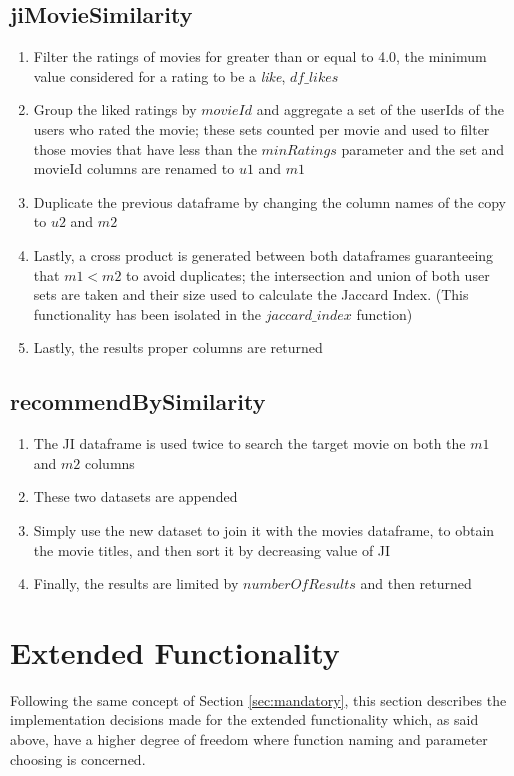 \documentclass[10pt,twocolumn]{article}
\begin{document}
\subsection{jiMovieSimilarity}
\begin{enumerate}
    \itemsep0em
    \item Filter the ratings of movies for greater than or equal to 4.0, the minimum value considered for a rating to be a \textit{like}, $df\_likes$
    \item Group the liked ratings by $movieId$ and aggregate a set of the userIds of the users who rated the movie; these sets counted per movie and used to filter those movies that have less than the $minRatings$ parameter and the set and movieId columns are renamed to $u1$ and $m1$
    \item Duplicate the previous dataframe by changing the column names of the copy to $u2$ and $m2$
    \item Lastly, a cross product is generated between both dataframes guaranteeing that $m1 < m2$ to avoid duplicates; the intersection and union of both user sets are taken and their size used to calculate the Jaccard Index. (This functionality has been isolated in the $jaccard\_index$ function)
    \item Lastly, the results proper columns are returned
\end{enumerate}

\subsection{recommendBySimilarity}
\begin{enumerate}
    \itemsep0em
    \item The JI dataframe is used twice to search the target movie on both the $m1$ and $m2$ columns
    \item These two datasets are appended
    \item Simply use the new dataset to join it with the movies dataframe, to obtain the movie titles, and then sort it by decreasing value of JI
    \item Finally, the results are limited by $numberOfResults$ and then returned 
\end{enumerate}

\section{Extended Functionality}\label{sec:extended}
Following the same concept of Section \ref{sec:mandatory}, this section describes the implementation decisions made for the extended functionality which, as said above, have a higher degree of freedom where function naming and parameter choosing is concerned.
\end{document}
